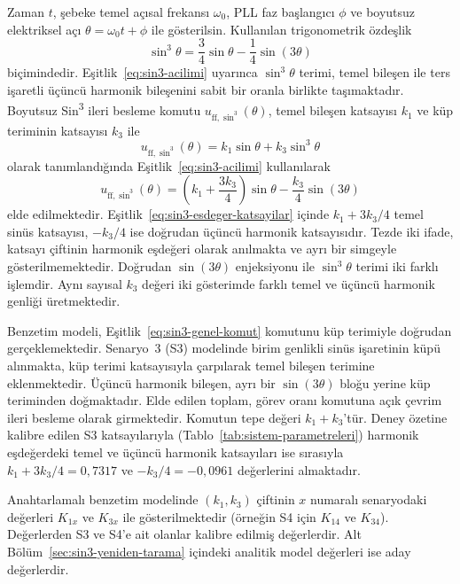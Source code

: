 Zaman $t$, şebeke temel açısal frekansı $\omega_0$, PLL faz başlangıcı $\phi$ ve boyutsuz elektriksel açı $\theta=\omega_0t+\phi$ ile gösterilsin. Kullanılan trigonometrik özdeşlik
\begin{equation}
  \sin^3\theta=\frac{3}{4}\sin\theta-\frac{1}{4}\sin(3\theta)
  \label{eq:sin3-acilimi}
\end{equation}
biçimindedir. Eşitlik~\eqref{eq:sin3-acilimi} uyarınca $\sin^3\theta$ terimi, temel bileşen ile ters işaretli üçüncü harmonik bileşenini sabit bir oranla birlikte taşımaktadır. Boyutsuz Sin\textsuperscript{3} ileri besleme komutu $u_{\mathrm{ff},\sin^3}(\theta)$, temel bileşen katsayısı $k_1$ ve küp teriminin katsayısı $k_3$ ile
\begin{equation}
  u_{\mathrm{ff},\sin^3}(\theta)=k_1\sin\theta+k_3\sin^3\theta
  \label{eq:sin3-genel-komut}
\end{equation}
olarak tanımlandığında Eşitlik~\eqref{eq:sin3-acilimi} kullanılarak
\begin{equation}
  u_{\mathrm{ff},\sin^3}(\theta)
  =\left(k_1+\frac{3k_3}{4}\right)\sin\theta-\frac{k_3}{4}\sin(3\theta)
  \label{eq:sin3-esdeger-katsayilar}
\end{equation}
elde edilmektedir. Eşitlik~\eqref{eq:sin3-esdeger-katsayilar} içinde $k_1+3k_3/4$ temel sinüs katsayısı, $-k_3/4$ ise doğrudan üçüncü harmonik katsayısıdır. Tezde iki ifade, katsayı çiftinin harmonik eşdeğeri olarak anılmakta ve ayrı bir simgeyle gösterilmemektedir. Doğrudan $\sin(3\theta)$ enjeksiyonu ile $\sin^3\theta$ terimi iki farklı işlemdir. Aynı sayısal $k_3$ değeri iki gösterimde farklı temel ve üçüncü harmonik genliği üretmektedir.

Benzetim modeli, Eşitlik~\eqref{eq:sin3-genel-komut} komutunu küp terimiyle doğrudan gerçeklemektedir. Senaryo~3 (S3) modelinde birim genlikli sinüs işaretinin küpü alınmakta, küp terimi katsayısıyla çarpılarak temel bileşen terimine eklenmektedir. Üçüncü harmonik bileşen, ayrı bir $\sin(3\theta)$ bloğu yerine küp teriminden doğmaktadır. Elde edilen toplam, görev oranı komutuna açık çevrim ileri besleme olarak girmektedir. Komutun tepe değeri $k_1+k_3$'tür. Deney özetine kalibre edilen S3 katsayılarıyla (Tablo~\ref{tab:sistem-parametreleri}) harmonik eşdeğerdeki temel ve üçüncü harmonik katsayıları ise sırasıyla $k_1+3k_3/4=0{,}7317$ ve $-k_3/4=-0{,}0961$ değerlerini almaktadır.

Anahtarlamalı benzetim modelinde $(k_1,k_3)$ çiftinin $x$ numaralı senaryodaki değerleri $K_{1x}$ ve $K_{3x}$ ile gösterilmektedir (örneğin S4 için $K_{14}$ ve $K_{34}$). Değerlerden S3 ve S4'e ait olanlar kalibre edilmiş değerlerdir. Alt Bölüm~\ref{sec:sin3-yeniden-tarama} içindeki analitik model değerleri ise aday değerlerdir.

